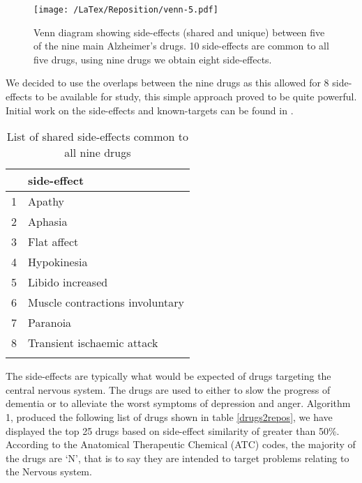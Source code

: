 \documentclass[preprint,11pt]{elsarticle}
\begin{document}
\begin{figure}[h]
  \begin{center}
	 \texttt{[image: /LaTex/Reposition/venn-5.pdf]} %
  \end{center}
 \caption{Venn diagram showing side-effects (shared and unique) between five of the nine main Alzheimer's drugs. 10 side-effects are common to all five drugs, using nine drugs we obtain eight side-effects.}
\label{venn}
\end{figure}

We decided to use the overlaps between the nine drugs as this allowed for 8 side-effects to be available for study, this simple approach proved to be quite powerful.  Initial work on the side-effects and known-targets can be found in \cite{McGarry2015a,McGarry2015b,McGarry2016a}. 

\begin{table}[ht]
\centering \scriptsize \caption{List of shared side-effects common to all nine drugs}
\begin{tabular}{rl}
  \hline
 & side-effect \\ 
  \hline
1 & Apathy \\ 
  2 & Aphasia \\ 
  3 & Flat affect \\ 
  4 & Hypokinesia \\ 
  5 & Libido increased \\ 
  6 & Muscle contractions involuntary \\ 
  7 & Paranoia \\ 
  8 & Transient ischaemic attack \\ 
   \hline \normalsize
\end{tabular}
\label{se8}
\end{table}

The side-effects are typically what would be expected of drugs targeting the central nervous system. The drugs are used to either to slow the progress of dementia or to alleviate the worst symptoms of depression and anger. Algorithm 1, produced the following list of drugs shown in table \ref{drugs2repos}, we have displayed the top 25 drugs based on side-effect similarity of greater than 50\%. According to the Anatomical Therapeutic Chemical (ATC) codes, the majority of the drugs are `N', that is to say they are intended to target problems relating to the Nervous system. 
\end{document}
